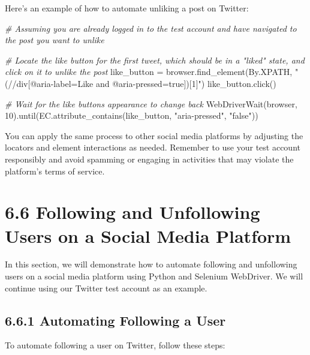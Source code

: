 \documentclass[
  paper=a4,
  ,captions=tableheading
]{scrartcl}
\newenvironment{Shaded}{}{}
\newcommand{\CommentTok}[1]{\textcolor[rgb]{0.38,0.63,0.69}{\textit{#1}}}
\newcommand{\DecValTok}[1]{\textcolor[rgb]{0.25,0.63,0.44}{#1}}
\newcommand{\NormalTok}[1]{#1}
\newcommand{\OperatorTok}[1]{\textcolor[rgb]{0.40,0.40,0.40}{#1}}
\newcommand{\StringTok}[1]{\textcolor[rgb]{0.25,0.44,0.63}{#1}}
\begin{document}
Here's an example of how to automate unliking a post on Twitter:

\begin{Shaded}
\begin{Highlighting}[]

\CommentTok{\# Assuming you are already logged in to the test account and have navigated to the post you want to unlike}

\CommentTok{\# Locate the like button for the first tweet, which should be in a "liked" state, and click on it to unlike the post}
\NormalTok{like\_button }\OperatorTok{=}\NormalTok{ browser.find\_element(By.XPATH, }\StringTok{"(//div[@aria{-}label=\textquotesingle{}Like\textquotesingle{} and @aria{-}pressed=\textquotesingle{}true\textquotesingle{}])[1]"}\NormalTok{)}
\NormalTok{like\_button.click()}

\CommentTok{\# Wait for the like button\textquotesingle{}s appearance to change back}
\NormalTok{WebDriverWait(browser, }\DecValTok{10}\NormalTok{).until(EC.attribute\_contains(like\_button, }\StringTok{"aria{-}pressed"}\NormalTok{, }\StringTok{"false"}\NormalTok{))}
\end{Highlighting}
\end{Shaded}

You can apply the same process to other social media platforms by
adjusting the locators and element interactions as needed. Remember to
use your test account responsibly and avoid spamming or engaging in
activities that may violate the platform's terms of service.

\hypertarget{following-and-unfollowing-users-on-a-social-media-platform}{%
\section{6.6 Following and Unfollowing Users on a Social Media
Platform}\label{following-and-unfollowing-users-on-a-social-media-platform}}

In this section, we will demonstrate how to automate following and
unfollowing users on a social media platform using Python and Selenium
WebDriver. We will continue using our Twitter test account as an
example.

\hypertarget{automating-following-a-user}{%
\subsection{6.6.1 Automating Following a
User}\label{automating-following-a-user}}

To automate following a user on Twitter, follow these steps:
\end{document}
